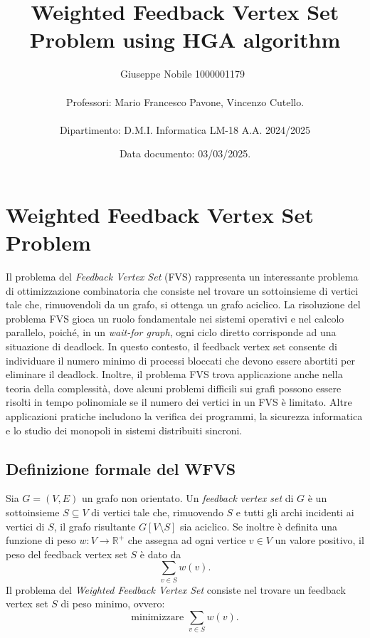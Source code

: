 \documentclass[12pt,a4paper,twoside]{article}
\title{Weighted Feedback Vertex Set Problem using HGA algorithm}
\newcommand{\studentname}{Giuseppe Nobile 1000001179}
\newcommand{\tutor}{Mario Francesco Pavone, Vincenzo Cutello}
\newcommand{\reportdate}{03/03/2025}
\newcommand{\department}{D.M.I. Informatica LM-18 A.A. 2024/2025}
\begin{document}
\author{\studentname ~ \\ \\ Professori: \tutor.\\
\\
Dipartimento: \department}

\date{Data documento: \reportdate.}

\renewcommand\abstractname{Summary}

\pagestyle{fancy}
\fancyhead{}
\fancyhead[C]{\studentname~}
\fancyfoot{}
\fancyfoot[C]{\thepage}
\renewcommand{\headrulewidth}{0pt}
\renewcommand{\footrulewidth}{0pt}

\renewcommand\bibname{Riferimenti}
\renewcommand*\contentsname{Indice}
\renewcommand{\figurename}{Fig.}
\renewcommand{\tablename}{Tab.}

\begin{figure}[h!]
    \centering
    \maketitle
\end{figure}

\tableofcontents
\clearpage

\section{Weighted Feedback Vertex Set Problem}
Il problema del \emph{Feedback Vertex Set} (FVS) rappresenta un interessante problema di ottimizzazione combinatoria che consiste nel trovare un sottoinsieme di vertici tale che, rimuovendoli da un grafo, si ottenga un grafo aciclico. La risoluzione del problema FVS gioca un ruolo fondamentale nei sistemi operativi e nel calcolo parallelo, poiché, in un \emph{wait-for graph}, ogni ciclo diretto corrisponde ad una situazione di deadlock. In questo contesto, il feedback vertex set consente di individuare il numero minimo di processi bloccati che devono essere abortiti per eliminare il deadlock. Inoltre, il problema FVS trova applicazione anche nella teoria della complessità, dove alcuni problemi difficili sui grafi possono essere risolti in tempo polinomiale se il numero dei vertici in un FVS è limitato. Altre applicazioni pratiche includono la verifica dei programmi, la sicurezza informatica e lo studio dei monopoli in sistemi distribuiti sincroni.

\bigskip

\subsection{Definizione formale del WFVS}
Sia \( G = (V, E) \) un grafo non orientato. Un \emph{feedback vertex set} di \( G \) è un sottoinsieme \( S \subseteq V \) di vertici tale che, rimuovendo \( S \) e tutti gli archi incidenti ai vertici di \( S \), il grafo risultante \( G[V \setminus S] \) sia aciclico. Se inoltre è definita una funzione di peso \( w : V \rightarrow \mathbb{R}^+ \) che assegna ad ogni vertice \( v \in V \) un valore positivo, il peso del feedback vertex set \( S \) è dato da
\[
\sum_{v \in S} w(v).
\]
Il problema del \emph{Weighted Feedback Vertex Set} consiste nel trovare un feedback vertex set \( S \) di peso minimo, ovvero:
\[
\text{minimizzare } \sum_{v \in S} w(v).
\]
\end{document}
